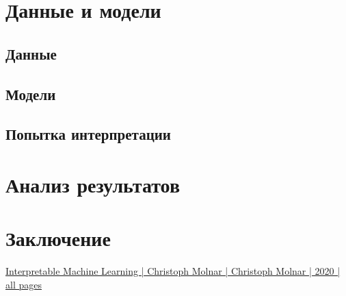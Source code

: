 \documentclass[a4paper, 12pt]{article}
\begin{document}
	\section{Данные и модели}
	
	\subsection{Данные}
	
	\subsection{Модели}
	
	\subsection{Попытка интерпретации}
	
	\newpage
	
	\section{Анализ результатов}
	
	\newpage
	
	\section{Заключение}
	
	\newpage
	
	\begin{thebibliography}{99}
		\href{https://christophm.github.io/interpretable-ml-book/}{Interpretable Machine Learning | Christoph Molnar | Christoph Molnar | 2020 | all pages}
	\end{thebibliography}
\end{document}
